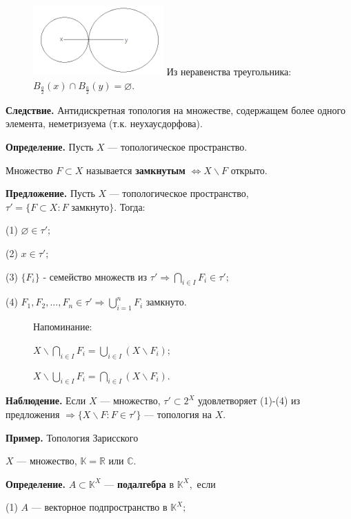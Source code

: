 \documentclass[12pt,a4paper]{article}
\begin{document}
\begin{figure}
	\includegraphics[width = 5cm]{lect2_4.png}
	Из неравенства треугольника: $B_{\frac{a}{2}}(x) \cap B_{\frac{a}{2}}(y) = \varnothing.$
\end{figure}
	
\textbf{Следствие.} Антидискретная топология на множестве, содержащем более одного элемента, неметризуема (т.к. неухаусдорфова).
	
\textbf{Определение.} Пусть $X$ --- топологическое пространство.
	
Множество $F \subset X$ называется \textbf{замкнутым} $\Leftrightarrow X \backslash F$ открыто.
	
\textbf{Предложение.} Пусть $X$ --- топологическое пространство, $\tau' = \{ F \subset X\!\!: F \text{ замкнуто}\}$. Тогда:
	
(1) $\varnothing \in \tau';$
	
(2) $x \in \tau';$
	
(3) $\{F_i\}$ - семейство множеств из $\tau' \Rightarrow \bigcap_{i \in I} F_i \in \tau';$
	
(4) $F_1, F_2, ..., F_n \in \tau' \Rightarrow \bigcup^n_{i = 1} F_i$ замкнуто.
	
\begin{figure}
	Напоминание:
		
	$X \backslash \bigcap_{i \in I} F_i = \bigcup_{i \in I}\left( X \backslash F_i \right);$
		
	$X \backslash \bigcup_{i \in I} F_i = \bigcap_{i \in I}\left( X \backslash F_i \right).$
\end{figure}
	
	
\textbf{Наблюдение.} Если $X$ --- множество, $\tau' \subset 2^X$ удовлетворяет (1)-(4) из предложения $\Rightarrow \{X \backslash F \colon F \in \tau'\}$ --- топология на $X.$
	
\textbf{Пример.} Топология Зарисского
	
$X$ --- множество, $\mathbb{K} = \mathbb{R}$ или $\mathbb{C}$.
	
\textbf{Определение.} $A \subset \mathbb{K}^X$ --- \textbf{подалгебра} в $\mathbb{K}^X,$ если
	
(1) $A$ --- векторное подпространство в $\mathbb{K}^X;$
	
\end{document}
